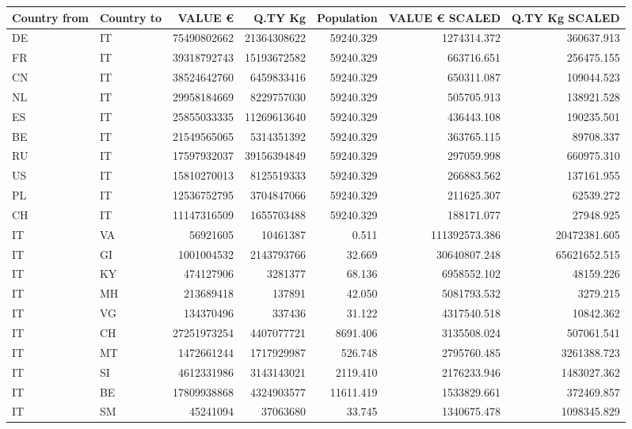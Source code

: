 \begin{tabular}{llrrrrr}
\toprule
Country from & Country to & VALUE € & Q.TY Kg & Population & VALUE € SCALED & Q.TY Kg SCALED \\
\midrule
 DE & IT & 75490802662 & 21364308622 & 59240.329 & 1274314.372 & 360637.913 \\
 FR & IT & 39318792743 & 15193672582 & 59240.329 & 663716.651 & 256475.155 \\
 CN & IT & 38524642760 & 6459833416 & 59240.329 & 650311.087 & 109044.523 \\
 NL & IT & 29958184669 & 8229757030 & 59240.329 & 505705.913 & 138921.528 \\
 ES & IT & 25855033335 & 11269613640 & 59240.329 & 436443.108 & 190235.501 \\
 BE & IT & 21549565065 & 5314351392 & 59240.329 & 363765.115 & 89708.337 \\
 RU & IT & 17597932037 & 39156394849 & 59240.329 & 297059.998 & 660975.310 \\
 US & IT & 15810270013 & 8125519333 & 59240.329 & 266883.562 & 137161.955 \\
 PL & IT & 12536752795 & 3704847066 & 59240.329 & 211625.307 & 62539.272 \\
 CH & IT & 11147316509 & 1655703488 & 59240.329 & 188171.077 & 27948.925 \\
\midrule
 IT & VA & 56921605 & 10461387 & 0.511 & 111392573.386 & 20472381.605 \\
 IT & GI & 1001004532 & 2143793766 & 32.669 & 30640807.248 & 65621652.515 \\
 IT & KY & 474127906 & 3281377 & 68.136 & 6958552.102 & 48159.226 \\
 IT & MH & 213689418 & 137891 & 42.050 & 5081793.532 & 3279.215 \\
 IT & VG & 134370496 & 337436 & 31.122 & 4317540.518 & 10842.362 \\
 IT & CH & 27251973254 & 4407077721 & 8691.406 & 3135508.024 & 507061.541 \\
 IT & MT & 1472661244 & 1717929987 & 526.748 & 2795760.485 & 3261388.723 \\
 IT & SI & 4612331986 & 3143143021 & 2119.410 & 2176233.946 & 1483027.362 \\
 IT & BE & 17809938868 & 4324903577 & 11611.419 & 1533829.661 & 372469.857 \\
 IT & SM & 45241094 & 37063680 & 33.745 & 1340675.478 & 1098345.829 \\
\bottomrule
\end{tabular}